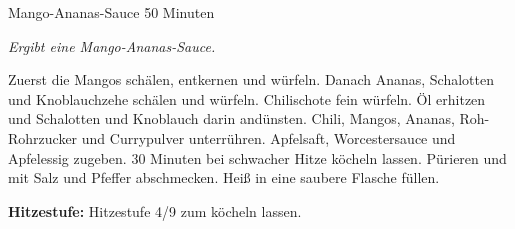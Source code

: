 \begin{recipe}{Mango-Ananas-Sauce} {} {50 Minuten}

  \freeform
  \textit{Ergibt eine Mango-Ananas-Sauce.}


  Zuerst die Mangos schälen, entkernen und würfeln.
  Danach Ananas, Schalotten und Knoblauchzehe schälen und würfeln.
  Chilischote fein würfeln.
  Öl erhitzen und Schalotten und Knoblauch darin andünsten.
  Chili, Mangos, Ananas, Roh-Rohrzucker und Currypulver unterrühren.
  Apfelsaft, Worcestersauce und Apfelessig zugeben.
  30 Minuten bei schwacher Hitze köcheln lassen.
  Pürieren und mit Salz und Pfeffer abschmecken.
  Heiß in eine saubere Flasche füllen.

  \freeform
  \hrulefill

  \freeform
  \textbf{Hitzestufe:}
  Hitzestufe 4/9 zum köcheln lassen.

  \end{recipe}
